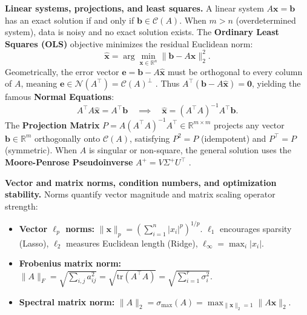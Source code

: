 \documentclass[11pt,a4paper]{article}
\begin{document}
	\textbf{Linear systems, projections, and least squares.}
	A linear system $A\mathbf{x} = \mathbf{b}$ has an exact solution if and only if $\mathbf{b} \in \mathcal{C}(A)$. When $m > n$ (overdetermined system), data is noisy and no exact solution exists. The \textbf{Ordinary Least Squares (OLS)} objective minimizes the residual Euclidean norm:
	\begin{equation}
		\hat{\mathbf{x}} = \arg\min_{\mathbf{x} \in \mathbb{R}^n} \|\mathbf{b} - A\mathbf{x}\|_2^2.
	\end{equation}
	Geometrically, the error vector $\mathbf{e} = \mathbf{b} - A\hat{\mathbf{x}}$ must be orthogonal to every column of $A$, meaning $\mathbf{e} \in \mathcal{N}(A^{\!\top}) = \mathcal{C}(A)^\perp$ \parencite[Chapter~4]{strang2012linear}. Thus $A^{\!\top}(\mathbf{b} - A\hat{\mathbf{x}}) = \mathbf{0}$, yielding the famous \textbf{Normal Equations}:
	\begin{equation}
		A^{\!\top}A \hat{\mathbf{x}} = A^{\!\top}\mathbf{b} \quad\implies\quad \hat{\mathbf{x}} = (A^{\!\top}A)^{-1}A^{\!\top}\mathbf{b}.
		\label{eq:normal_equations}
	\end{equation}
	The \textbf{Projection Matrix} $P = A(A^{\!\top}A)^{-1}A^{\!\top} \in \mathbb{R}^{m \times m}$ projects any vector $\mathbf{b} \in \mathbb{R}^m$ orthogonally onto $\mathcal{C}(A)$, satisfying $P^2 = P$ (idempotent) and $P^\top = P$ (symmetric). When $A$ is singular or non-square, the general solution uses the \textbf{Moore-Penrose Pseudoinverse} $A^+ = V \Sigma^+ U^\top$ \parencite{golub2013, strang2019}.

	\textbf{Vector and matrix norms, condition numbers, and optimization stability.}
	Norms quantify vector magnitude and matrix scaling operator strength:
	\begin{itemize}[nosep]
		\item \textbf{Vector $\ell_p$ norms:} $\|\mathbf{x}\|_p = \left(\sum_{i=1}^n |x_i|^p\right)^{1/p}$. $\ell_1$ encourages sparsity (Lasso), $\ell_2$ measures Euclidean length (Ridge), $\ell_\infty = \max_i |x_i|$.
		\item \textbf{Frobenius matrix norm:} $\|A\|_F = \sqrt{\sum_{i,j} a_{ij}^2} = \sqrt{\mathrm{tr}(A^\top A)} = \sqrt{\sum_{i=1}^r \sigma_i^2}$.
		\item \textbf{Spectral matrix norm:} $\|A\|_2 = \sigma_{\max}(A) = \max_{\|\mathbf{x}\|_2=1} \|A\mathbf{x}\|_2$.
	\end{itemize}
\end{document}
